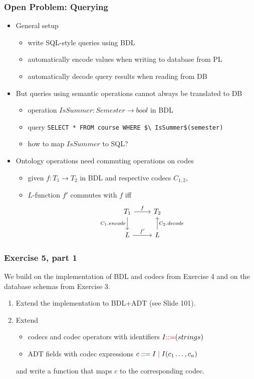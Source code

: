 \begin{frame}\frametitle{Open Problem: Querying}
\begin{itemize}
\item General setup
 \begin{itemize}
 \item write SQL-style queries using BDL
 \item automatically encode values when writing to database from PL
 \item automatically decode query results when reading from DB
 \end{itemize}
\item But queries using semantic operations cannot always be translated to DB
 \begin{itemize}
  \item operation $IsSummer: Semester \to bool$ in BDL
  \item query \lstinline|SELECT * FROM course WHERE $\ IsSummer$(semester)|
  \item how to map $IsSummer$ to SQL?
 \end{itemize}
\item Ontology operations need commuting operations on codes
\begin{itemize}
\item given $f: T_1\to T_2$ in BDL and respective codecs $C_{1,2}$,
\item $L$-function $f'$ commutes with $f$ iff \[
  \begin{tikzcd}[ampersand replacement=\&]
    T_1 \arrow[d, "C_1.encode"'] \arrow[r, "f"] \& T_2\\
    L \arrow[r, "f'"] \& L \arrow[u, "C_2.decode"']
  \end{tikzcd}
\]
\end{itemize}
\end{itemize}
\end{frame}

\begin{frame}\frametitle{Exercise 5, part 1}
We build on the implementation of BDL and codecs from Exercise 4 and on the database schemas from Exercise 3.

\begin{enumerate}
 \item Extend the implementation to BDL+ADT (see Slide 101).
 \item Extend 
  \begin{itemize}
  \item codecs and codec operators with identifiers $I{\color{red}::=} (strings)$
  \item ADT fields with codec expressions $c::=I \;{\color{red}|}\; I(c_1\ldots,c_n)$
  \end{itemize}
  and write a function that maps $c$ to the corresponding codec.
\end{enumerate}
\end{frame}

